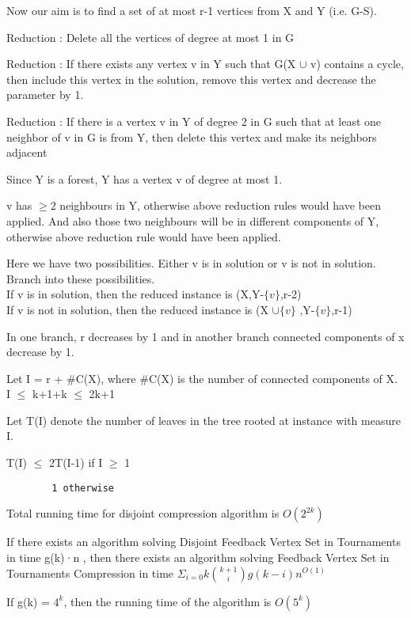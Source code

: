 Now our aim is to find a set of at most r-1 vertices from X and Y (i.e. G-S).

Reduction :
Delete all the vertices of degree at most 1 in G

Reduction :
If there exists any vertex v in Y such that G(X $\cup$ v) contains a cycle,
then include this vertex in the solution, remove this vertex and decrease the parameter by 1.

Reduction :
If there is a vertex v in Y of degree 2 in G such
that at least one neighbor of v in G is from Y, then delete this vertex
and make its neighbors adjacent

Since Y is a forest, Y has a vertex v of degree at most 1. 

v has $\geq2$ neighbours in Y, otherwise above reduction rules would have been applied.
And also those two neighbours will be in different components of Y, otherwise above reduction
rule would have been applied. 

Here we have two possibilities. Either v is in solution or v is not in solution.
Branch into these possibilities. \\
If v is in solution, then the reduced instance is (X,Y-$\{v\}$,r-2) \\
If v is not in solution, then the reduced instance is (X $ \cup \{v\}$ ,Y-$\{v\}$,r-1)

In one branch, r decreases by 1 and in another branch connected components of x decrease by 1.

Let I = r + \#C(X), where \#C(X) is the number of connected components of X. \\
I $\leq$ k+1+k $\leq$ 2k+1

Let T(I) denote the number of leaves in the tree rooted at instance with measure I.

T(I) $\leq$ 2T(I-1) if I $\geq$ 1 
\vspace{-0.5cm}
\begin{verbatim}  
        1 otherwise
\end{verbatim}
\vspace{-0.5cm}

Total running time for disjoint compression algorithm is $O(2^{2k})$

If there exists an algorithm solving Disjoint Feedback Vertex Set in
 Tournaments in time g(k)·n , then there exists an algorithm
solving Feedback Vertex Set in Tournaments Compression in time
$\Sigma_{i=0}{k}   \binom{k+1}{i} g(k-i) n^{O(1)}$

If g(k) = $4^k$, then the running time of the algorithm is $O(5^k)$  


